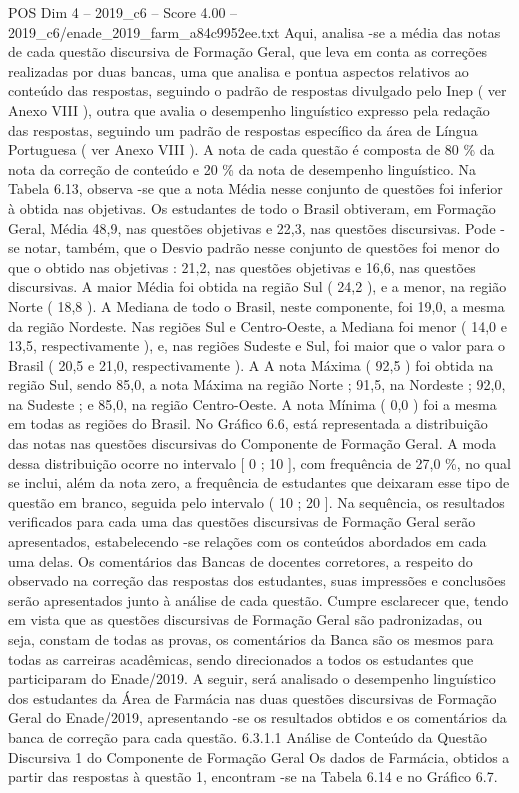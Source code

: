 \begin{textsample}{POS Dim 4 – 2019\_c6 – Score 4.00 – 2019\_c6/enade\_2019\_farm\_a84c9952ee.txt}
Aqui, analisa -se a média das notas de cada questão discursiva de Formação Geral, que leva em conta as correções realizadas por duas bancas, uma que analisa e pontua aspectos relativos ao conteúdo das respostas, seguindo o padrão de respostas divulgado pelo Inep ( ver Anexo VIII ), outra que avalia o desempenho linguístico expresso pela redação das respostas, seguindo um padrão de respostas específico da área de Língua Portuguesa ( ver Anexo VIII ).
A nota de cada questão é composta de 80 \% da nota da correção de conteúdo e 20 \% da nota de desempenho linguístico.
Na Tabela 6.13, observa -se que a nota Média nesse conjunto de questões foi inferior à obtida nas objetivas.
Os estudantes de todo o Brasil obtiveram, em Formação Geral, Média 48,9, nas questões objetivas e 22,3, nas questões discursivas.
Pode -se notar, também, que o Desvio padrão nesse conjunto de questões foi menor do que o obtido nas objetivas : 21,2, nas questões objetivas e 16,6, nas questões discursivas.
A maior Média foi obtida na região Sul ( 24,2 ), e a menor, na região Norte ( 18,8 ).
A Mediana de todo o Brasil, neste componente, foi 19,0, a mesma da região Nordeste.
Nas regiões Sul e Centro-Oeste, a Mediana foi menor ( 14,0 e 13,5, respectivamente ), e, nas regiões Sudeste e Sul, foi maior que o valor para o Brasil ( 20,5 e 21,0, respectivamente ).
A A nota Máxima ( 92,5 ) foi obtida na região Sul, sendo 85,0, a nota Máxima na região Norte ; 91,5, na Nordeste ; 92,0, na Sudeste ; e 85,0, na região Centro-Oeste.
A nota Mínima ( 0,0 ) foi a mesma em todas as regiões do Brasil.
No Gráfico 6.6, está representada a distribuição das notas nas questões discursivas do Componente de Formação Geral.
A moda dessa distribuição ocorre no intervalo [ 0 ; 10 ], com frequência de 27,0 \%, no qual se inclui, além da nota zero, a frequência de estudantes que deixaram esse tipo de questão em branco, seguida pelo intervalo ( 10 ; 20 ].
Na sequência, os resultados verificados para cada uma das questões discursivas de Formação Geral serão apresentados, estabelecendo -se relações com os conteúdos abordados em cada uma delas.
Os comentários das Bancas de docentes corretores, a respeito do observado na correção das respostas dos estudantes, suas impressões e conclusões serão apresentados junto à análise de cada questão.
Cumpre esclarecer que, tendo em vista que as questões discursivas de Formação Geral são padronizadas, ou seja, constam de todas as provas, os comentários da Banca são os mesmos para todas as carreiras acadêmicas, sendo direcionados a todos os estudantes que participaram do Enade/2019.
A seguir, será analisado o desempenho linguístico dos estudantes da Área de Farmácia nas duas questões discursivas de Formação Geral do Enade/2019, apresentando -se os resultados obtidos e os comentários da banca de correção para cada questão. 6.3.1.1 Análise de Conteúdo da Questão Discursiva 1 do Componente de Formação Geral Os dados de Farmácia, obtidos a partir das respostas à questão 1, encontram -se na Tabela 6.14 e no Gráfico 6.7.

\end{textsample}
